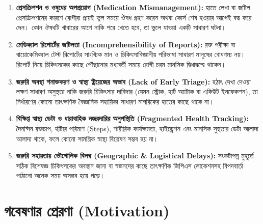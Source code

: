 \documentclass[12pt,a4paper,oneside]{report}
\begin{document}
\begin{enumerate}
    \item \textbf{প্রেসক্রিপশন ও ওষুধের অপপ্রয়োগ (Medication Mismanagement):} হাতে লেখা বা জটিল প্রেসক্রিপশনের কারণে রোগীরা প্রায়ই ভুল সময়ে ঔষধ গ্রহণ করেন অথবা কোর্স শেষ হওয়ার আগেই বন্ধ করে দেন। কোন ঔষধটি খাবারের আগে নাকি পরে খেতে হবে, তা ভুলে যাওয়া একটি সাধারণ ঘটনা।
    \item \textbf{মেডিক্যাল রিপোর্টের জটিলতা (Incomprehensibility of Reports):} রক্ত পরীক্ষা বা বায়োকেমিক্যাল টেস্ট রিপোর্টের সাংখ্যিক মান ও চিকিৎসাবিজ্ঞানীয় পরিভাষা সাধারণ মানুষের বোধগম্য নয়। রিপোর্ট নিয়ে চিকিৎসকের কাছে পৌঁছানোর মধ্যবর্তী সময়ে রোগী চরম মানসিক দ্বিধাদ্বন্দ্বে থাকেন।
    \item \textbf{জরুরি অবস্থা শনাক্তকরণ ও স্বাস্থ্য ট্রিয়েজের অভাব (Lack of Early Triage):} হঠাৎ দেখা দেওয়া লক্ষণ সাধারণ অসুস্থতা নাকি জরুরি চিকিৎসার দাবিদার (যেমন স্ট্রোক, হার্ট অ্যাটাক বা একিউট ইনফেকশন), তা নির্ধারণের কোনো তাৎক্ষণিক বৈজ্ঞানিক সহায়িকা সাধারণ নাগরিকের হাতের কাছে থাকে না।
    \item \textbf{বিক্ষিপ্ত স্বাস্থ্য ডেটা ও ধারাবাহিক নজরদারির অনুপস্থিতি (Fragmented Health Tracking):} দৈনন্দিন রক্তচাপ, হাঁটার পরিমাণ (Steps), শারীরিক কার্যক্ষমতা, হাইড্রেশন এবং মানসিক সুস্থতার ডেটা আলাদা আলাদা থাকে, ফলে কোনো সামগ্রিক স্বাস্থ্য বিশ্লেষণ সম্ভব হয় না।
    \item \textbf{জরুরি সহায়তায় ভৌগোলিক বিলম্ব (Geographic \& Logistical Delays):} সংকটাপন্ন মুহূর্তে সঠিক বিশেষজ্ঞ চিকিৎসকের অবস্থান জানা বা স্বজনদের কাছে তাৎক্ষণিক জিপিএস লোকেশনসহ বিপদবার্তা পাঠানো অনেক সময় অসম্ভব হয়ে পড়ে।
\end{enumerate}

\chapter{গবেষণার প্রেরণা (Motivation)}
\end{document}
